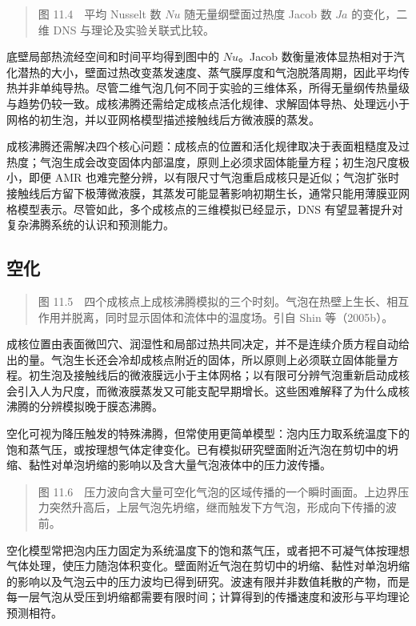 \documentclass[11pt,a4paper,openany,fontset=none]{ctexbook}
\begin{document}
\begin{quote}\small 图 11.4　平均 Nusselt 数 $Nu$ 随无量纲壁面过热度 Jacob 数 $Ja$ 的变化，二维 DNS 与理论及实验关联式比较。\end{quote}
底壁局部热流经空间和时间平均得到图中的 $Nu$。Jacob 数衡量液体显热相对于汽化潜热的大小，壁面过热改变蒸发速度、蒸气膜厚度和气泡脱落周期，因此平均传热并非单纯导热。尽管二维气泡几何不同于实验的三维体系，所得无量纲传热量级与趋势仍较一致。成核沸腾还需给定成核点活化规律、求解固体导热、处理远小于网格的初生泡，并以亚网格模型描述接触线后方微液膜的蒸发。

成核沸腾还需解决四个核心问题：成核点的位置和活化规律取决于表面粗糙度及过热度；气泡生成会改变固体内部温度，原则上必须求固体能量方程；初生泡尺度极小，即便 AMR 也难完整分辨，以有限尺寸气泡重启成核只是近似；气泡扩张时接触线后方留下极薄微液膜，其蒸发可能显著影响初期生长，通常只能用薄膜亚网格模型表示。尽管如此，多个成核点的三维模拟已经显示，DNS 有望显著提升对复杂沸腾系统的认识和预测能力。

\subsection{空化}
\begin{quote}\small 图 11.5　四个成核点上成核沸腾模拟的三个时刻。气泡在热壁上生长、相互作用并脱离，同时显示固体和流体中的温度场。引自 Shin 等（2005b）。\end{quote}
成核位置由表面微凹穴、润湿性和局部过热共同决定，并不是连续介质方程自动给出的量。气泡生长还会冷却成核点附近的固体，所以原则上必须联立固体能量方程。初生泡及接触线后的微液膜远小于主体网格；以有限可分辨气泡重新启动成核会引入人为尺度，而微液膜蒸发又可能支配早期增长。这些困难解释了为什么成核沸腾的分辨模拟晚于膜态沸腾。


空化可视为降压触发的特殊沸腾，但常使用更简单模型：泡内压力取系统温度下的饱和蒸气压，或按理想气体定律变化。已有模拟研究壁面附近汽泡在剪切中的坍缩、黏性对单泡坍缩的影响以及含大量气泡液体中的压力波传播。

\begin{quote}\small 图 11.6　压力波向含大量可空化气泡的区域传播的一个瞬时画面。上边界压力突然升高后，上层气泡先坍缩，继而触发下方气泡，形成向下传播的波前。\end{quote}
空化模型常把泡内压力固定为系统温度下的饱和蒸气压，或者把不可凝气体按理想气体处理，使压力随泡体积变化。壁面附近气泡在剪切中的坍缩、黏性对单泡坍缩的影响以及气泡云中的压力波均已得到研究。波速有限并非数值耗散的产物，而是每一层气泡从受压到坍缩都需要有限时间；计算得到的传播速度和波形与平均理论预测相符。
\end{document}
